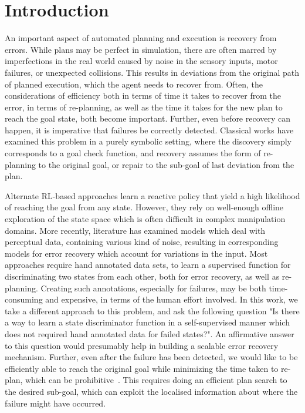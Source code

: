 \section{Introduction}\label{sec:intro}
An important aspect of automated planning and execution is recovery from errors. While plans may be perfect in simulation, there are often marred by imperfections in the real world caused by noise in the sensory inputs, motor failures, or unexpected collisions. This results in deviations from the original path of planned execution, which the agent needs to recover from. Often, the considerations of efficiency both in terms of time it takes to recover from the error, in terms of re-planning, as well as the time it takes for the new plan to reach the goal state, both become important. Further, even before recovery can happen, it is imperative that failures be correctly detected. Classical works have examined this problem in a purely symbolic setting, where the discovery simply corresponds to a goal check function, and recovery assumes the form of re-planning to the original goal, or repair to the sub-goal of last deviation from the plan.  

Alternate RL-based approaches learn a reactive policy that yield a high likelihood of reaching the goal from any state. However, they rely on well-enough offline exploration of the state space which is often difficult in complex manipulation domains. More recently, literature has examined models which deal with perceptual data, containing various kind of noise, resulting in corresponding models for error recovery which account for variations in the input. Most approaches require hand annotated data sets, to learn a supervised function for discriminating two states from each other, both for error recovery, as well as re-planning.
%
Creating such annotations, especially for failures, may be both time-consuming and expensive, in terms of the human effort involved. 
%
In this work, we take a different approach to this problem, and ask the following question "Is there a way to learn a state discriminator function in a self-supervised manner which does not required hand annotated data for failed states?". An affirmative answer to this question would presumably help in building a scalable error recovery mechanism. Further, even after the failure has been detected, we would like to be efficiently able to reach the original goal while minimizing the time taken to re-plan, which can be prohibitive~\cite{fox2006plan}. This requires doing an efficient plan search to the desired sub-goal, which can exploit the localised information about where the failure might have occurred. 

